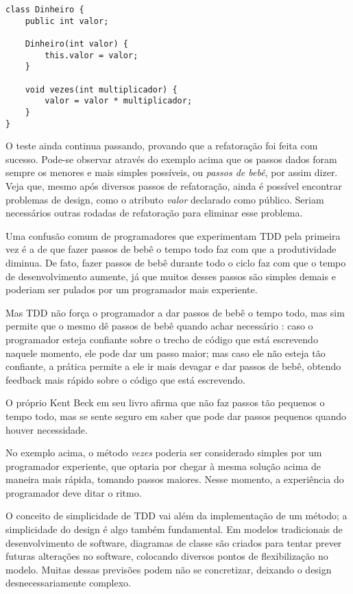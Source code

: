 \begin{lstlisting}[frame=trbl]
class Dinheiro {
	public int valor;
	
	Dinheiro(int valor) {
		this.valor = valor;
	}
	
	void vezes(int multiplicador) {
		valor = valor * multiplicador;
	}
}
\end{lstlisting}

O teste ainda continua passando, provando que a refatoração foi feita com
sucesso. Pode-se observar através do exemplo acima que os passos dados foram
sempre os menores e mais simples possíveis, ou \textit{passos de bebê}, por
assim dizer. Veja que, mesmo após diversos passos de refatoração, ainda é
possível encontrar problemas de design, como o atributo \textit{valor}
declarado como público. Seriam necessários outras rodadas de refatoração para
eliminar esse problema.

Uma confusão comum de programadores que experimentam TDD pela primeira vez é a
de que fazer passos de bebê o tempo todo faz com que a produtividade diminua.
De fato, fazer passos de bebê durante todo o ciclo faz com que o tempo de
desenvolvimento aumente, já que muitos desses passos são simples demais e
poderiam ser pulados por um programador mais experiente. 

Mas TDD não força o programador a dar passos de bebê o tempo todo, mas sim
permite que o mesmo dê passos de bebê quando achar necessário
\cite{TDDByExample}: caso o programador esteja confiante sobre o trecho de
código  que está escrevendo naquele momento, ele pode dar um passo maior;  mas
caso ele não esteja tão confiante, a prática permite a ele ir mais devagar e 
dar passos de bebê, obtendo feedback mais rápido sobre o código que está
escrevendo.

O próprio Kent Beck em seu livro afirma que não faz passos tão pequenos o tempo
todo, mas se sente seguro em saber que pode dar passos pequenos quando houver
necessidade.

No exemplo acima, o método \textit{vezes} poderia ser considerado simples por
um programador experiente, que optaria por chegar à mesma solução acima de
maneira mais rápida, tomando passos maiores. Nesse momento, a experiência do
programador deve ditar o ritmo.

O conceito de simplicidade de TDD vai além da implementação de um método; a
simplicidade do design é algo também fundamental. Em modelos tradicionais de
desenvolvimento de software, diagramas de classe são criados para tentar prever
futuras alterações no software, colocando diversos pontos de flexibilização no
modelo. Muitas dessas previsões podem não se concretizar, deixando o design
desnecessariamente complexo.


